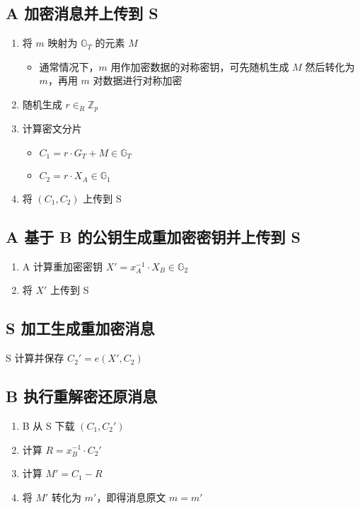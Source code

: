 \documentclass[a4paper,10pt]{article}
\newcommand{\bG}{\mathbb{G}}
\newcommand{\bZ}{\mathbb{Z}}
\begin{document}
\subsection{A 加密消息并上传到 S}

\begin{enumerate}
  \item 将 \(m\) 映射为 \(\bG_T\) 的元素 \(M\)
    \begin{itemize}
      \item 通常情况下，\(m\) 用作加密数据的对称密钥，可先随机生成 \(M\) 然后转化为 \(m\)，再用 \(m\) 对数据进行对称加密
    \end{itemize}
  \item 随机生成 \(r\in_R \bZ_p\)
  \item 计算密文分片
    \begin{itemize}
      \item \(C_1=r\cdot G_T+M \in\bG_T\)
      \item \(C_2=r\cdot X_A \in\bG_1\)
    \end{itemize}
  \item 将 \((C_1,C_2)\) 上传到 S
\end{enumerate}

\subsection{A 基于 B 的公钥生成重加密密钥并上传到 S}

\begin{enumerate}
  \item A 计算重加密密钥 \(X'=x_A^{-1}\cdot X_B\in\bG_2\)
  \item 将 \(X'\) 上传到 S
\end{enumerate}

\subsection{S 加工生成重加密消息}

S 计算并保存 \(C_2'=e(X',C_2)\)

\subsection{B 执行重解密还原消息}

\begin{enumerate}
  \item B 从 S 下载 \((C_1,C_2')\)
  \item 计算 \(R=x_B^{-1}\cdot C_2'\)
  \item 计算 \(M'=C_1-R\)
  \item 将 \(M'\) 转化为 \(m'\)，即得消息原文 \(m=m'\)
\end{enumerate}
\end{document}

